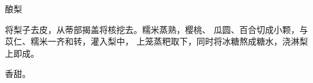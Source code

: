 \begin{recipe}{酿梨}

\ingredients


\cooking

将梨子去皮，从蒂部揭盖将核挖去。糯米蒸熟，樱桃、 瓜圆、百合切成小颗，与苡仁、糯米一齐和转，灌入梨中， 上笼蒸粑取下，同时将冰糖熬成糖水，浇淋梨上即成。

\notes

香甜。

\end{recipe}

